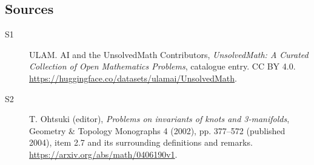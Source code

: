 \documentclass[11pt]{article}
\begin{document}
\subsection{Sources}
\begin{description}
\item[\hypertarget{source:statement:1}{S1}] ULAM. AI and the UnsolvedMath Contributors, \emph{UnsolvedMath: A Curated Collection of Open Mathematics Problems}, catalogue entry. CC BY 4.0. \url{https://huggingface.co/datasets/ulamai/UnsolvedMath}.
\item[\hypertarget{source:statement:2}{S2}] T. Ohtsuki (editor), \emph{Problems on invariants of knots and 3-manifolds}, Geometry \& Topology Monographs 4 (2002), pp. 377--572 (published 2004), item 2.7 and its surrounding definitions and remarks. \url{https://arxiv.org/abs/math/0406190v1}.
\end{description}
\label{end:statement}
\end{document}
